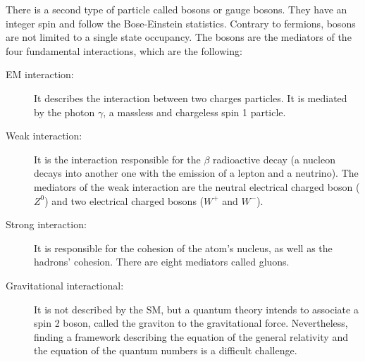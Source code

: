     There is a second type of particle called bosons or gauge bosons.
    They have an integer spin and follow the Bose-Einstein statistics.
    Contrary to fermions, bosons are not limited to a single state occupancy.
    The bosons are the mediators of the four fundamental interactions, which are the following:
    
    \begin{description}
      \item[\gls{EM} interaction:] It describes the interaction between two charges particles. 
      It is mediated by the photon $\gamma$, a massless and chargeless spin 1 particle.

      \item[Weak interaction:] It is the interaction responsible for the $\beta$ radioactive decay (a nucleon decays into another one with the emission of a lepton and a neutrino).
       The mediators of the weak interaction are the neutral electrical charged boson ($Z^0$) and two electrical charged bosons ($W^+$ and $W^-$).

      \item[Strong interaction:] It is responsible for the cohesion of the atom's nucleus, as well as the hadrons' cohesion.
      There are eight mediators called gluons.

      \item[Gravitational interactional:] It is not described by the \gls{SM}, but a quantum theory intends to associate a spin 2 boson, called the graviton to the gravitational force.
      Nevertheless, finding a framework describing the equation of the general relativity and the equation of the quantum numbers is a difficult challenge.
    \end{description}


